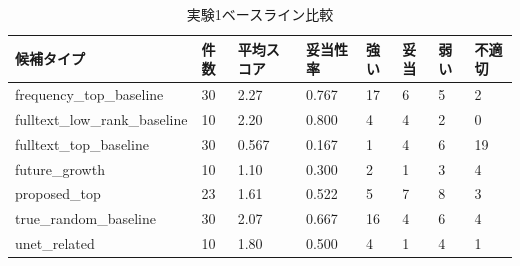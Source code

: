 \begin{table}[tbp]
\centering
\small
\caption{実験1ベースライン比較}
\label{tab:experiment1\_baseline\_comparison}
\begin{tabular}{llllllll}
\toprule
候補タイプ & 件数 & 平均スコア & 妥当性率 & 強い & 妥当 & 弱い & 不適切 \\
\midrule
frequency\_top\_baseline & 30 & 2.27 & 0.767 & 17 & 6 & 5 & 2 \\
fulltext\_low\_rank\_baseline & 10 & 2.20 & 0.800 & 4 & 4 & 2 & 0 \\
fulltext\_top\_baseline & 30 & 0.567 & 0.167 & 1 & 4 & 6 & 19 \\
future\_growth & 10 & 1.10 & 0.300 & 2 & 1 & 3 & 4 \\
proposed\_top & 23 & 1.61 & 0.522 & 5 & 7 & 8 & 3 \\
true\_random\_baseline & 30 & 2.07 & 0.667 & 16 & 4 & 6 & 4 \\
unet\_related & 10 & 1.80 & 0.500 & 4 & 1 & 4 & 1 \\
\bottomrule
\end{tabular}
\end{table}
